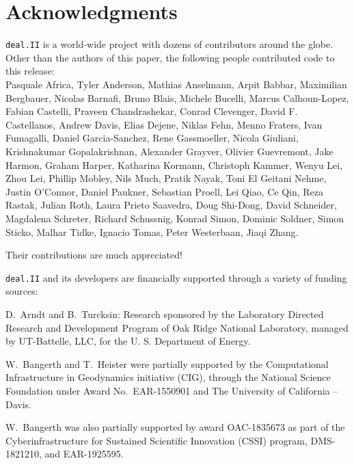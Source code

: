 \documentclass{ansarticle-preprint}
\newcommand{\specialword}[1]{\texttt{#1}}
\newcommand{\dealii}{{\specialword{deal.II}}\xspace}
\begin{document}
\section{Acknowledgments}

\dealii{} is a world-wide project with dozens of contributors around the
globe. Other than the authors of this paper, the following people
contributed code to this release:\\
%
%
Pasquale Africa,
Tyler Anderson,
Mathias Anselmann,
Arpit Babbar,
Maximilian Bergbauer,
Nicolas Barnafi,
Bruno Blais,
Michele Bucelli,
Marcus Calhoun-Lopez,
Fabian Castelli, %
Praveen Chandrashekar,
Conrad Clevenger,
David F. Castellanos,
Andrew Davis,
Elias Dejene,
Niklas Fehn,
Menno Fraters,
Ivan Fumagalli,
Daniel Garcia-Sanchez,
Rene Gassmoeller,
Nicola Giuliani,
Krishnakumar Gopalakrishnan,
Alexander Grayver,
Olivier Guevremont,
Jake Harmon,
Graham Harper,
Katharina Kormann,
Christoph Kammer,
Wenyu Lei,
Zhou Lei,
Phillip Mobley,
Nils Much,
Pratik Nayak,
Toni El Geitani Nehme,
Justin O'Connor,
Daniel Paukner,
Sebastian Proell,
Lei Qiao,
Ce Qin,
Reza Rastak,
Julian Roth,
Laura Prieto Saavedra,
Doug Shi-Dong,
David Schneider,
Magdalena Schreter,
Richard Schussnig,
Konrad Simon,
Dominic Soldner,
Simon Sticko,
Malhar Tidke,
Ignacio Tomas,
Peter Westerbaan,
Jiaqi Zhang.


Their contributions are much appreciated!


\bigskip

\dealii{} and its developers are financially supported through a
variety of funding sources:

D.~Arndt and B.~Turcksin: Research sponsored by the Laboratory Directed Research and
Development Program of Oak Ridge National Laboratory, managed by UT-Battelle,
LLC, for the U. S. Department of Energy.

W.~Bangerth and T.~Heister were partially
supported by the Computational Infrastructure
in Geodynamics initiative (CIG), through the National Science
Foundation under Award No.~EAR-1550901 and The
University of California -- Davis.


W.~Bangerth was also partially supported by award OAC-1835673 as part of the Cyberinfrastructure for Sustained Scientific Innovation (CSSI)
program, DMS-1821210,
and EAR-1925595.
\end{document}
